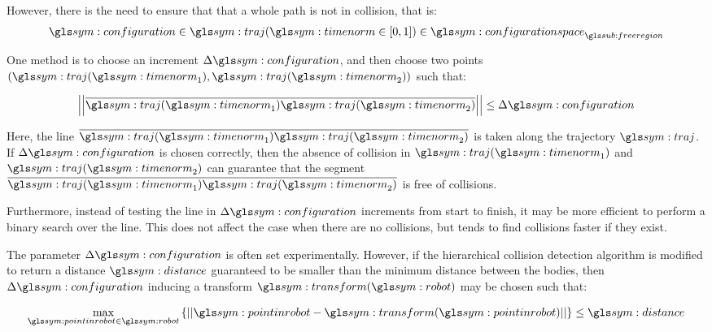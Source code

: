 				However, there is the need to ensure that that a whole path is
				not in collision, that is:
				\begin{equation}
					\configuration \in
						\traj(\timenorm \in [0, 1])
							\in \configurationspace_{\freeregion}
				\end{equation}

				One method is to choose an increment $\Delta\configuration$, and
				then choose two points $(\traj(\timenorm_1),
				\traj(\timenorm_2))$ such that:

				\begin{equation}
					\norm
					{%
						\vecline
						{%
							\traj(\timenorm_1)
						}
						{%
							\traj(\timenorm_2)
						}
					}
					\leq
					\Delta\configuration
				\end{equation}

				Here, the line
				\(
					\vecline
					{%
						\traj(\timenorm_1)
					}
					{%
						\traj(\timenorm_2)
					}
				\)
				is taken along the trajectory $\traj$. If
				$\Delta\configuration$ is chosen correctly, then the absence of
				collision in $\traj(\timenorm_1)$ and $\traj(\timenorm_2)$ can
				guarantee that the segment
				\(
					\vecline
					{%
						\traj(\timenorm_1)
					}
					{%
						\traj(\timenorm_2)
					}
				\)
				is free of collisions.

				Furthermore, instead
				of testing the line in $\Delta\configuration$ increments from
				start to finish, it may be more efficient to perform a binary
				search over the line. This does not affect the case when there
				are no collisions, but tends to find collisions faster if they
				exist.

				The parameter $\Delta\configuration$ is often set
				experimentally. However, if the hierarchical collision detection
				algorithm is modified to return a distance $\distance$
				guaranteed to be smaller than the minimum distance between the
				bodies, then $\Delta\configuration$ inducing a transform
				$\transform(\robot)$ may be chosen such that:

				\begin{equation}
					\max_{\pointinrobot\in\robot}
					\left\{%
						\norm
						{%
							\pointinrobot - \transform(\pointinrobot)
						}
					\right\}
					\leq
					\distance
				\end{equation}


